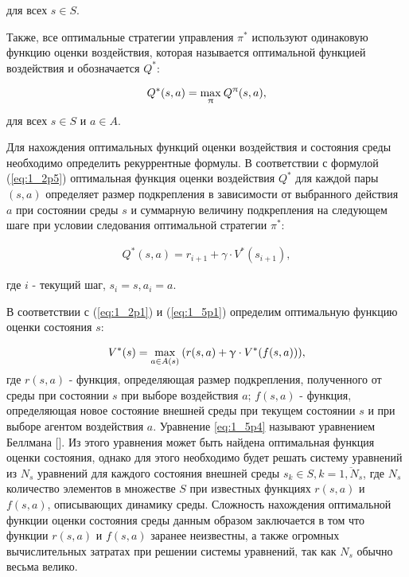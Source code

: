 \noindent для всех $ s \in S $.

Также, все оптимальные стратегии управления $ \pi^* $ используют одинаковую функцию оценки воздействия, которая называется оптимальной функцией воздействия и обозначается $ Q^* $:

\begin{equation}
\label{eq:1_5p2}
\begin{alignedat}{2}
Q^*(s, a) = \smash{\displaystyle\max_{\pi}} \: Q^{\pi}(s, a),
\end{alignedat}
\end{equation}

\noindent для всех $ s \in S $ и $ a \in A $.
 
Для нахождения оптимальных функций оценки воздействия и состояния среды необходимо определить рекуррентные формулы. В соответствии с формулой (\ref{eq:1_2p5}) оптимальная функция оценки воздействия $ Q^* $ для каждой пары $ (s, a) $ определяет размер подкрепления в зависимости от выбранного действия $ a $ при состоянии среды $ s $ и суммарную величину подкрепления на следующем шаге при условии следования оптимальной стратегии $ \pi^* $:

\begin{equation}
\label{eq:1_5p3}
\begin{alignedat}{2}
Q^*(s, a) = r_{i+1} + \gamma\cdot V^*(s_{i+1}),
\end{alignedat}
\end{equation}

\noindent где $ i $ - текущий шаг, $ s_i=s, a_i=a $.

В соответствии с (\ref{eq:1_2p1}) и (\ref{eq:1_5p1}) определим оптимальную функцию оценки состояния $ s $:  

\begin{equation}
\label{eq:1_5p4}
\begin{alignedat}{2}
V^*(s) = \smash{\displaystyle\max_{a \in A(s)}} \: (r(s, a) + \gamma \cdot V^*(f(s, a))),
\end{alignedat}
\end{equation}

\noindent где $ r(s, a) $ - функция, определяющая размер подкрепления, полученного от среды при состоянии $ s $ при выборе воздействия $ a $; $ f(s, a) $ - функция, определяющая новое состояние внешней среды при текущем состоянии $ s $ и при выборе агентом воздействия $ a $. Уравнение 
\ref{eq:1_5p4} называют уравнением Беллмана []. Из этого уравнения может быть найдена оптимальная функция оценки состояния, однако для этого необходимо будет решать систему уравнений из $ N_s $ уравнений для каждого состояния внешней среды $ s_k \in S, k=\overline{1,N_s} $, где $ N_s $ количество элементов в множестве $ S $ при известных функциях $ r(s, a) $ и $ f(s, a) $, описывающих динамику среды. Сложность нахождения оптимальной функции оценки состояния среды данным образом заключается в том что функции $ r(s, a) $ и $ f(s, a) $ заранее неизвестны, а также огромных вычислительных затратах при решении системы уравнений, так как $ N_s $ обычно весьма велико.


